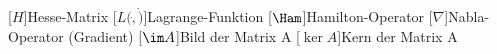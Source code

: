 \begin{acronym}[LabVIEW] %
	[\ensuremath{H}]{Hesse-Matrix}
	[\ensuremath{L(\dot,\dot)}]{Lagrange-Funktion}
	[\ensuremath{\Ham}]{Hamilton-Operator}
	[\ensuremath{\nabla}]{Nabla-Operator (Gradient)}
	[\ensuremath{\im A}]{Bild der Matrix A}
	[\ensuremath{\ker A}]{Kern der Matrix A}
\end{acronym}